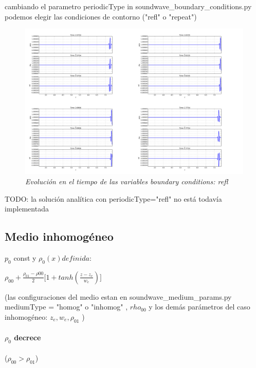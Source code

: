 \documentclass{article}
\begin{document}
\begin{description}
\item cambiando el parametro periodicType in soundwave\_boundary\_conditions.py  podemos  elegir las condiciones de contorno ("refl" o "repeat")
\item
\begin{figure}[!ht]
 \centering
 \includegraphics[scale=0.2]{reflhom.png}
 \caption{\emph{Evolución en el tiempo de las variables boundary conditions: refl }}
\end{figure}
\item TODO: la solución analítica con periodicType="refl" no está todavía implementada
\end{description}

\subsection{Medio inhomogéneo}
$p_0 $ const y $\rho_0(x) definida:$
\begin{center}
	$\rho_{00} + \frac{\rho_{01}-\rho{00}}{2}\big[ 1 + tanh(\frac{z-z_e}{w_e})\big] $
\end{center}

({\small las configuraciones del medio estan en soundwave\_medium\_params.py mediumType = "homog" o "inhomog" , $rho_{00}$ y 
los demás parámetros del caso inhomogéneo: $z_e, w_e, \rho_{01}$ })

\newpage
\paragraph{$\rho_0$ decrece }($\rho_{00} > \rho_{01} $)
\end{document}
